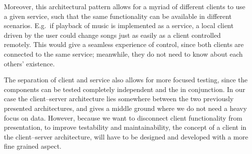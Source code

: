 Moreover, this architectural pattern allows for a myriad of different clients to use a given service, such that the same functionality can be available in different scenarios.
E.g.~if playback of music is implemented as a service, a local client driven by the user could change songs just as easily as a client controlled remotely.
This would give a seamless experience of control, since both clients are connected to the same service; meanwhile, they do not need to know about each others' existence.

The separation of client and service also allows for more focused testing, since the components can be tested completely independent and the in conjunction.
In our case the client--server architecture lies somewhere between the two previously presented architectures, and gives a middle ground where we do not need a heavy focus on data.
However, because we want to disconnect client functionality from presentation, to improve testability and maintainability, the concept of a client in the client--server architecture, will have to be designed and developed with a more fine grained aspect.

